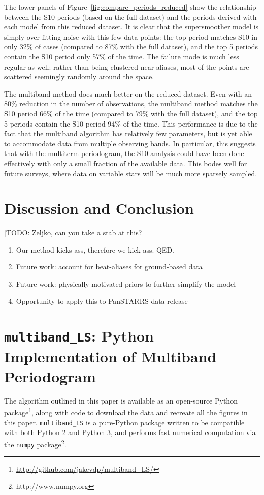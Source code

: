 \documentclass[12pt,preprint]{aastex}
\newcommand{\todo}[1]{{\color{red} [TODO: #1]}}
\newcommand{\Fig}[1]{Figure~\ref{fig:#1}}
\newcommand{\fig}[1]{\Fig{#1}}
\begin{document}
The lower panels of \fig{compare_periods_reduced} show the relationship between the S10 periods (based on the full dataset) and the periods derived with each model from this reduced dataset. It is clear that the supersmoother model is simply over-fitting noise with this few data points: the top period matches S10 in only 32\% of cases (compared to 87\% with the full dataset), and the top 5 periods contain the S10 period only 57\% of the time. The failure mode is much less regular as well: rather than being clustered near aliases, most of the points are scattered seemingly randomly around the space.

The multiband method does much better on the reduced dataset. Even with an 80\% reduction in the number of observations, the multiband method matches the S10 period 66\% of the time (compared to 79\% with the full dataset), and the top 5 periods contain the S10 period 94\% of the time. This performance is due to the fact that the multiband algorithm has relatively few parameters, but is yet able to accommodate data from multiple observing bands. In particular, this suggests that with the multiterm periodogram, the S10 analysis could have been done effectively with only a small fraction of the available data. This bodes well for future surveys, where data on variable stars will be much more sparsely sampled.

\section{Discussion and Conclusion}

\todo{Zeljko, can you take a stab at this?}

\begin{enumerate}
  \item Our method kicks ass, therefore we kick ass. QED.
  \item Future work: account for beat-aliases for ground-based data
  \item Future work: physically-motivated priors to further simplify the model
  \item Opportunity to apply this to PanSTARRS data release
\end{enumerate}





\appendix
\section{{\tt multiband\_LS}: Python Implementation of Multiband Periodogram}
The algorithm outlined in this paper is available as an open-source Python package\footnote{\url{http://github.com/jakevdp/multiband_LS/}}, along with code to download the data and recreate all the figures in this paper.
{\tt multiband\_LS} is a pure-Python package written to be compatible with both Python 2 and Python 3, and performs fast numerical computation via the {\tt numpy} package\footnote{http://www.numpy.org}.
\end{document}
